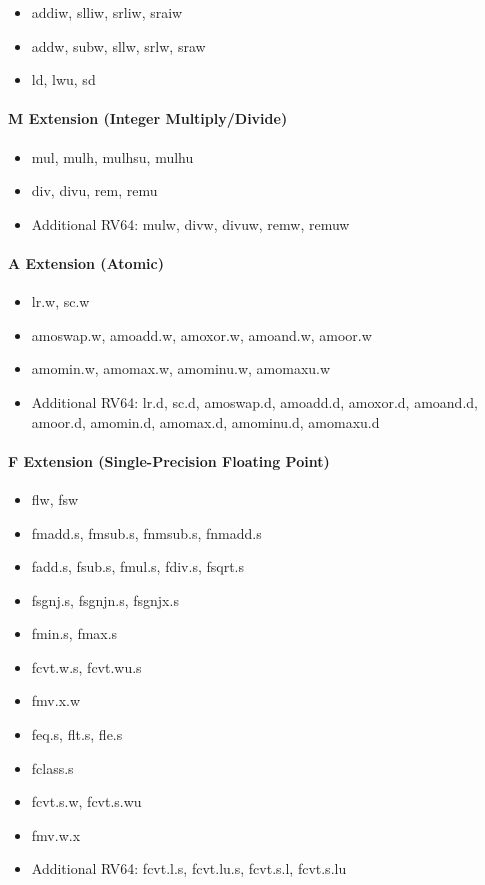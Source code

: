 \documentclass[]{article}
\providecommand{\tightlist}{%
  \setlength{\itemsep}{0pt}\setlength{\parskip}{0pt}}
\let\oldparagraph\paragraph
\renewcommand{\paragraph}[1]{\oldparagraph{#1}\mbox{}}
\begin{document}
\begin{itemize}
\tightlist
\item
  addiw, slliw, srliw, sraiw
\item
  addw, subw, sllw, srlw, sraw
\item
  ld, lwu, sd
\end{itemize}

\hypertarget{m-extension-integer-multiplydivide}{%
\paragraph{M Extension (Integer
Multiply/Divide)}\label{m-extension-integer-multiplydivide}}

\begin{itemize}
\tightlist
\item
  mul, mulh, mulhsu, mulhu
\item
  div, divu, rem, remu
\item
  Additional RV64: mulw, divw, divuw, remw, remuw
\end{itemize}

\hypertarget{a-extension-atomic}{%
\paragraph{A Extension (Atomic)}\label{a-extension-atomic}}

\begin{itemize}
\tightlist
\item
  lr.w, sc.w
\item
  amoswap.w, amoadd.w, amoxor.w, amoand.w, amoor.w
\item
  amomin.w, amomax.w, amominu.w, amomaxu.w
\item
  Additional RV64: lr.d, sc.d, amoswap.d, amoadd.d, amoxor.d, amoand.d,
  amoor.d, amomin.d, amomax.d, amominu.d, amomaxu.d
\end{itemize}

\hypertarget{f-extension-single-precision-floating-point}{%
\paragraph{F Extension (Single-Precision Floating
Point)}\label{f-extension-single-precision-floating-point}}

\begin{itemize}
\tightlist
\item
  flw, fsw
\item
  fmadd.s, fmsub.s, fnmsub.s, fnmadd.s
\item
  fadd.s, fsub.s, fmul.s, fdiv.s, fsqrt.s
\item
  fsgnj.s, fsgnjn.s, fsgnjx.s
\item
  fmin.s, fmax.s
\item
  fcvt.w.s, fcvt.wu.s
\item
  fmv.x.w
\item
  feq.s, flt.s, fle.s
\item
  fclass.s
\item
  fcvt.s.w, fcvt.s.wu
\item
  fmv.w.x
\item
  Additional RV64: fcvt.l.s, fcvt.lu.s, fcvt.s.l, fcvt.s.lu
\end{itemize}
\end{document}
